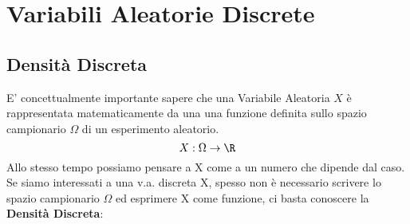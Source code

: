 


\pagebreak
\section{Variabili Aleatorie Discrete}

\subsection{Densità Discreta}
E' concettualmente importante sapere che una Variabile Aleatoria $X$ è rappresentata matematicamente da una
una funzione definita sullo spazio campionario $\Omega$ di un esperimento aleatorio.
\[
	X:\Omega \to \R
\]
Allo stesso tempo possiamo pensare a X come a un numero che dipende dal caso.
Se siamo interessati a una v.a. discreta X, spesso non è necessario scrivere lo
spazio campionario $\Omega$ ed esprimere X come funzione,
ci basta conoscere la \textbf{Densità Discreta}:

